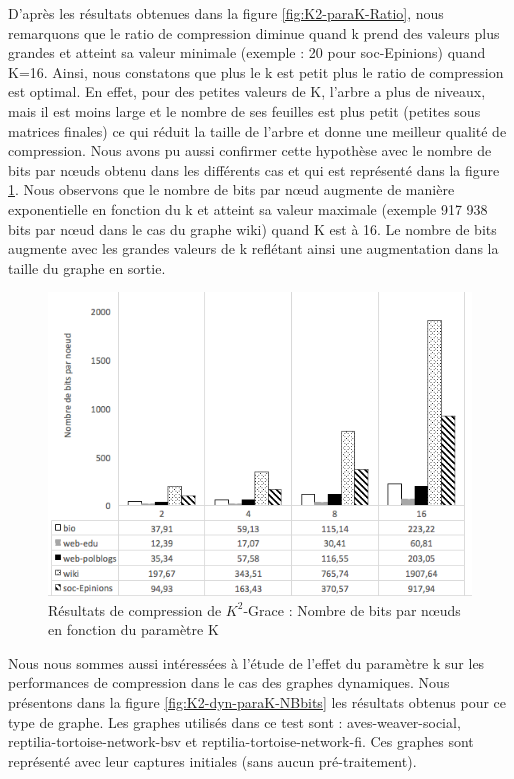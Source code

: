 D'après les résultats obtenues dans la figure \ref{fig:K2-paraK-Ratio}, nous remarquons que le ratio de compression diminue quand k prend des valeurs plus grandes et atteint sa valeur minimale (exemple : 20 pour soc-Epinions) quand K=16. Ainsi, nous constatons que plus le k est petit plus le ratio de compression est optimal. En effet, pour des petites valeurs de K, l'arbre a plus de niveaux, mais il est moins large et le nombre de ses feuilles est plus petit (petites sous matrices finales) ce qui réduit la taille de l'arbre et donne une meilleur qualité de compression. Nous avons pu aussi confirmer cette hypothèse avec le nombre de bits par nœuds obtenu dans les différents cas et qui est représenté dans la figure \ref{fig:K2-paraK-NBbits}. Nous observons que le nombre de bits par nœud augmente de manière exponentielle en fonction du k et atteint sa valeur maximale (exemple 917 938 bits par nœud dans le cas du graphe wiki) quand K est à 16. Le nombre de bits augmente avec les grandes valeurs de k reflétant ainsi une augmentation dans la taille du graphe en sortie.

\begin{figure}[H]
	\centering
	\includegraphics[scale=0.8]{ressources/image/Tests/K2-paraK-NBbits.png}
	
	\caption{Résultats de compression de $K^2$-Grace : Nombre de bits par nœuds en fonction du paramètre K}
	\label{fig:K2-paraK-NBbits}
\end{figure}		


Nous nous sommes aussi intéressées à l'étude de l'effet du paramètre k sur les performances de compression dans le cas des graphes dynamiques. Nous présentons dans la figure \ref{fig:K2-dyn-paraK-NBbits} les résultats obtenus pour ce type de graphe. Les graphes utilisés dans ce test sont : aves-weaver-social, reptilia-tortoise-network-bsv et reptilia-tortoise-network-fi. Ces graphes sont représenté avec leur captures initiales (sans aucun pré-traitement).

